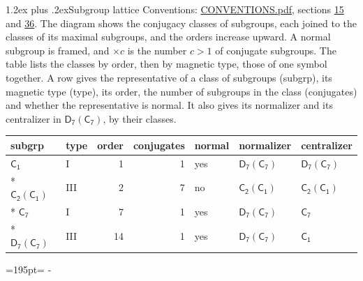 \documentclass[10pt,a4paper]{article}
\makeatletter
\renewcommand\section{\@startsection{section}{1}{\z@}{-3ex plus -1ex minus -.2ex}%
  {1.2ex plus .2ex}{\normalfont\large\sffamily\bfseries\color{parttitle}}}
\newcommand{\needspace}[1]{\par\penalty-100\begingroup\dimen0=#1\relax\dimen2=\pagegoal
  \advance\dimen2-\pagetotal\ifdim\dimen0>\dimen2\relax\ifdim\dimen2>0pt\vfil\break\fi\fi
  \endgroup}
\numberwithin{equation}{section}
\newcommand{\grp}[1]{\mathsf{#1}}
\newcommand{\nconj}[1]{{\scriptsize$\times#1$}}
\makeatother
\begin{document}
\section{Subgroup lattice}\label{s:subgroups}
Conventions: \href{../../CONVENTIONS.pdf}{CONVENTIONS.pdf}, sections \href{../../../rotation/CONVENTIONS.pdf\#conv.15}{15} and \href{../../CONVENTIONS.pdf\#conv.36}{36}.
The diagram shows the conjugacy classes of subgroups, each joined to the classes of its maximal subgroups, and the orders increase upward. \label{n:index.conjugates.c}\label{n:mark.conjugates}A normal subgroup is framed, and ${\times}c$ is the number $c > 1$ of conjugate subgroups. The table lists the classes by order, then by magnetic type, those of one symbol together. \label{n:head.subgroup}\label{n:head.magnetic.type}\label{n:head.order}\label{n:head.conjugates}\label{n:head.normal}A row gives the representative of a class of subgroups (subgrp), its magnetic type (type), its order, the number of subgroups in the class (conjugates) and whether the representative is normal. \label{n:head.normalizer}\label{n:head.centralizer}It also gives its normalizer and its centralizer in $\grp{D_{7}}(\grp{C_{7}})$, by their classes. 
\begin{center}
\end{center}
{\small\begin{longtable}{@{}llrrlll@{}}\toprule
subgrp & type & order & conjugates & normal & normalizer & centralizer\\\midrule\endhead
\bottomrule\endfoot\endlastfoot
\href{../../../rotation/data/pdf/C1.pdf}{$\grp{C_{1}}$} & I & 1 & 1 & yes & \href{D7-C7.pdf}{$\grp{D_{7}}(\grp{C_{7}})$} & \href{D7-C7.pdf}{$\grp{D_{7}}(\grp{C_{7}})$}\\*
\href{C2-C1.pdf}{$\grp{C_{2}}(\grp{C_{1}})$} & III & 2 & 7 & no & \href{C2-C1.pdf}{$\grp{C_{2}}(\grp{C_{1}})$} & \href{C2-C1.pdf}{$\grp{C_{2}}(\grp{C_{1}})$}\\*
\href{../../../rotation/data/pdf/C7.pdf}{$\grp{C_{7}}$} & I & 7 & 1 & yes & \href{D7-C7.pdf}{$\grp{D_{7}}(\grp{C_{7}})$} & \href{../../../rotation/data/pdf/C7.pdf}{$\grp{C_{7}}$}\\*
\href{D7-C7.pdf}{$\grp{D_{7}}(\grp{C_{7}})$} & III & 14 & 1 & yes & \href{D7-C7.pdf}{$\grp{D_{7}}(\grp{C_{7}})$} & \href{../../../rotation/data/pdf/C1.pdf}{$\grp{C_{1}}$}\\
\bottomrule\end{longtable}}
\needspace{195pt}
\end{document}
